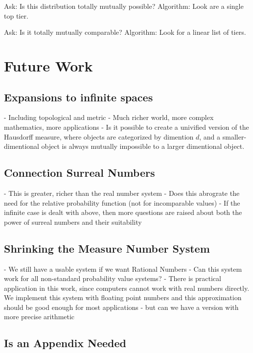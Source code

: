 \documentclass[twoside]{article}
\begin{document}
Ask: Is this distribution totally mutually possible? Algorithm: Look are a single top tier.

Ask: Is it totally mutually comparable? Algorithm: Look for a linear list of tiers.

\section{Future Work}
\subsection{Expansions to infinite spaces}
- Including topological and metric
- Much richer world, more complex mathematics, more applications
- Is it possible to create a univified version of the Hausdorff measure, where objects are categorized by dimention \(d\), and a smaller-dimentional object is always mutually impossible to a larger dimentional object.
\subsection{Connection Surreal Numbers}
- This is greater, richer than the real number system
- Does this abrograte the need for the relative probability function (not for incomparable values)
- If the infinite case is dealt with above, then more questions are raised about both the power of surreal numbers and their suitability
\subsection{Shrinking the Measure Number System}
- We still have a usable system if we want Rational Numbers
- Can this system work for all non-standard probability value systems?
- There is practical application in this work, since computers cannot work with real numbers directly. We implement this system with floating point numbers and this approximation should be good enough for most applications - but can we have a version with more precise arithmetic

\begin{appendices}

\section{Is an Appendix Needed}

\end{appendices}

\end{document}
